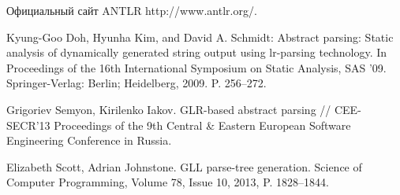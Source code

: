 \begin{thebibliography}{99}
Официальный сайт ANTLR http://www.antlr.org/.

Kyung-Goo Doh, Hyunha Kim, and David A. Schmidt: Abstract parsing: Static analysis of dynamically generated string output using lr-parsing technology. In Proceedings of the 16th International Symposium on Static Analysis, SAS ’09. Springer-Verlag: Berlin; Heidelberg, 2009. P. 256–272.

Grigoriev Semyon, Kirilenko Iakov. GLR-based abstract parsing // CEE-SECR’13 Proceedings of the 9th Central & Eastern European Software Engineering Conference in Russia.

Elizabeth Scott, Adrian Johnstone. GLL parse-tree generation. Science of Computer Programming, Volume 78, Issue 10, 2013, P. 1828–1844.


\end{thebibliography}



